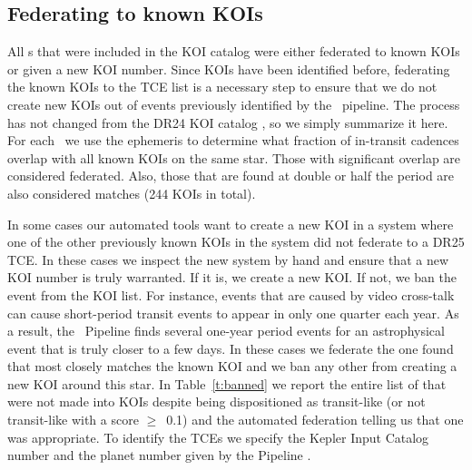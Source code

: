 \subsection{Federating to known KOIs}
\label{s:federation}
All \opstce s that were included in the KOI catalog were either federated to known KOIs or given a new KOI number. Since KOIs have been identified before, federating the known KOIs to the TCE list is a necessary step to ensure that we do not create new KOIs out of events previously identified by the \Kepler\ pipeline.  The process has not changed from the DR24 KOI catalog \citep[see \S4.2 of][]{Coughlin2016}, so we simply summarize it here.  For each \opstce\ we use the ephemeris to determine what fraction of in-transit cadences overlap with all known KOIs on the same star.  Those with significant overlap are considered federated.  Also, those that are found at double or half the period are also considered matches (244 KOIs in total).  

In some cases our automated tools want to create a new KOI in a system where one of the other previously known KOIs in the system did not federate to a DR25 TCE.  In these cases we inspect the new system by hand and ensure that a new KOI number is truly warranted. If it is, we create a new KOI. If not, we ban the event from the KOI list.  For instance, events that are caused by video cross-talk \citep{KIH} can cause short-period transit events to appear in only one quarter each year. As a result, the \Kepler\ Pipeline finds several one-year period events for an astrophysical event that is truly closer to a few days.  In these cases we federate the one found that most closely matches the known KOI and we ban any other  from creating a new KOI around this star. In Table~\ref{t:banned} we report the entire list of  that were not made into KOIs despite being dispositioned as transit-like (or not transit-like with a score $\ge$~0.1) and the automated federation telling us that one was appropriate. To identify the TCEs we specify the Kepler Input Catalog number and the planet number given by the \Kepler{} Pipeline \citep{Twicken2016}.


